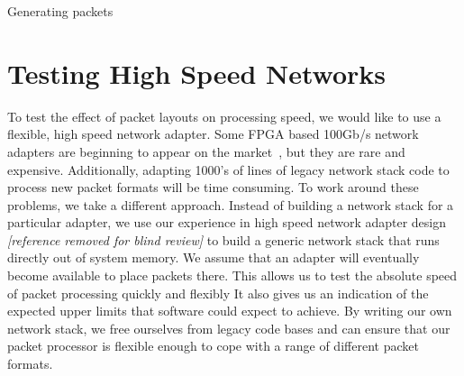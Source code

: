 

\begin{algorithm}



\caption{Generating packets}
\label{alg:net_gen}
\end{algorithm}


\section{Testing High Speed Networks}
\label{s:experiments}
To test the effect of packet layouts on processing speed, we would like to use a flexible, high speed network adapter. 
Some FPGA based 100Gb/s network adapters are beginning to appear on the market~\cite{100gnic}, but they are rare and expensive. 
Additionally, adapting 1000's of lines of legacy network stack code to process new packet formats will be time consuming. 
To work around these problems, we take a different approach. 
Instead of building a network stack for a particular adapter, we use our experience in high speed network adapter design \emph{[reference removed for blind review]} to build a generic network stack that runs directly out of system memory. 
We assume that an adapter will eventually become available to place packets there. 
This allows us to test the absolute speed of packet processing quickly and flexibly 
It also gives us an indication of the expected upper limits that software could expect to achieve. 
By writing our own network stack, we free ourselves from legacy code bases and can ensure that our packet processor is flexible enough to cope with a range of different packet formats. 


